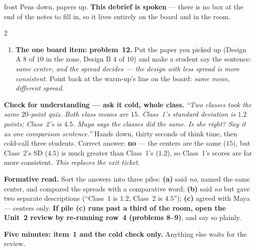 \documentclass[10pt]{article}
\begin{document}
\boxguard[24]
\begin{skillbox}{frost}
Pens down, papers up. \textbf{This debrief is spoken} --- there is no box at the end of the
notes to fill in, so it lives entirely on the board and in the room.
\begin{multicols}{2}
\begin{enumerate}[leftmargin=1.3em, nosep, itemsep=3pt]
  \item \textbf{The one board item: problem~12.} Put the paper you picked up (Design A $8$ of
        $10$ in the zone, Design B $4$ of $10$) and make a student say the sentence: \emph{same
        center, and the spread decides --- the design with less spread is more consistent.}
        Point back at the warm-up's line on the board: \emph{same mean, different spread}.
\end{enumerate}
\columnbreak
\textbf{Check for understanding --- ask it cold, whole class.} \emph{``Two classes took the
same $20$-point quiz. Both class means are $15$. Class~1's standard deviation is $1.2$
points; Class~2's is $4.5$. Maya says the classes did the same. Is she right? Say it as one
comparison sentence.''} Hands down, thirty seconds of think time, then cold-call three
students. Correct answer: \textbf{no} --- the centers are the same ($15$), but Class~2's SD
($4.5$) is much greater than Class~1's ($1.2$), so Class~1's scores are far more consistent.
\emph{This replaces the exit ticket.}

\textbf{Formative read.} Sort the answers into three piles: \textbf{(a)} said \emph{no},
named the same center, and compared the spreads with a comparative word; \textbf{(b)} said
\emph{no} but gave two separate descriptions (``Class~1 is $1.2$, Class~2 is $4.5$'');
\textbf{(c)} agreed with Maya --- centers only. \textbf{If pile (c) runs past a third of the
room, open the Unit~2 review by re-running row~4 (problems 8--9)}, and say so plainly.

\textbf{Five minutes: item~1 and the cold check only.} Anything else waits for the review.
\end{multicols}
\end{skillbox}
\end{document}
